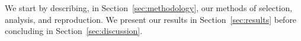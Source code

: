 


We start by describing, in Section~\ref{sec:methodology}, our methods of selection, analysis, and reproduction. We present our results in Section~\ref{sec:results} before concluding in Section~\ref{sec:discussion}.
